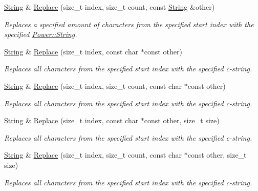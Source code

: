\begin{DoxyCompactItemize}
\hyperlink{class_power_1_1_string}{String} \& \hyperlink{class_power_1_1_string_a158278232a6b714c2bb5ce3a9cbf9642}{Replace} (size\+\_\+t index, size\+\_\+t count, const \hyperlink{class_power_1_1_string}{String} \&other)
\begin{DoxyCompactList}\small\item\em Replaces a specified amount of characters from the specified start index with the specified \hyperlink{class_power_1_1_string}{Power\+::\+String}. \end{DoxyCompactList}\item 
\hyperlink{class_power_1_1_string}{String} \& \hyperlink{class_power_1_1_string_ad94fc777a94a27590e93c32b86c6f84b}{Replace} (size\+\_\+t index, const char $\ast$const other)
\begin{DoxyCompactList}\small\item\em Replaces all characters from the specified start index with the specified c-\/string. \end{DoxyCompactList}\item 
\hyperlink{class_power_1_1_string}{String} \& \hyperlink{class_power_1_1_string_aa22a5533bc6b831a6985fe55591508df}{Replace} (size\+\_\+t index, size\+\_\+t count, const char $\ast$const other)
\begin{DoxyCompactList}\small\item\em Replaces all characters from the specified start index with the specified c-\/string. \end{DoxyCompactList}\item 
\hyperlink{class_power_1_1_string}{String} \& \hyperlink{class_power_1_1_string_af0fdb07e405fca79c65fe1756244c713}{Replace} (size\+\_\+t index, const char $\ast$const other, size\+\_\+t size)
\begin{DoxyCompactList}\small\item\em Replaces all characters from the specified start index with the specified c-\/string. \end{DoxyCompactList}\item 
\hyperlink{class_power_1_1_string}{String} \& \hyperlink{class_power_1_1_string_a27ca7d5fd4e996786e62c1222f9a82da}{Replace} (size\+\_\+t index, size\+\_\+t count, const char $\ast$const other, size\+\_\+t size)
\begin{DoxyCompactList}\small\item\em Replaces all characters from the specified start index with the specified c-\/string. \end{DoxyCompactList}\item 

\end{DoxyCompactItemize}
